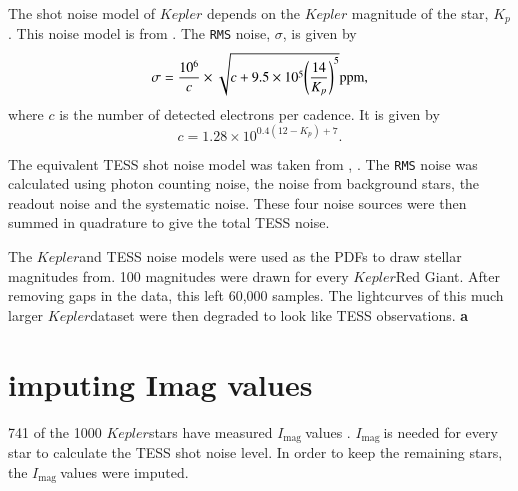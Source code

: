\documentclass[a4paper,fleqn,usenatbib,useAMS]{mnras}
\newcommand{\kep}{\ensuremath{Kepler}\:}
\newcommand{\imag}{\ensuremath{I_{\textrm{mag}}\:}}
\begin{document}
The shot noise model of $Kepler$ depends on the $Kepler$ magnitude of the star, $K_{p}$. This noise model is from \citet{gilliland_initial_2010}. The \texttt{RMS} noise, $\sigma$, is given by
\begin{equation}
\sigma = \frac{10^{6}}{c} \times \sqrt{c+9.5 \times 10^{5}\Bigg(\frac{14}{K_{p}}\Bigg)^{5}}  {\rm ppm},
\label{eq:kep noise}
\end{equation}
where $c$ is the number of detected electrons per cadence. It is given by
\begin{equation}
c = 1.28 \times 10^{0.4(12-K_{p})+7} .
\end{equation}

The equivalent TESS shot noise model was taken from \citet{sullivan_transiting_2015}, \citet{campante_asteroseismic_2016}. The \texttt{RMS} noise was calculated using photon counting noise, the noise from background stars, the readout noise and the systematic noise. These four noise sources were then summed in quadrature to give the total TESS noise.

The \kep and TESS noise models were used as the PDFs to draw stellar magnitudes from. 100 magnitudes were drawn for every \kep Red Giant. After removing gaps in the data, this left 60,000 samples. The lightcurves of this much larger \kep dataset were then degraded to look like TESS observations. {\bf a}



\section{imputing Imag values}

741 of the 1000 \kep stars have measured \imag values \citep{hog_tycho-2_2000}. \imag is needed for every star to calculate the TESS shot noise level. In order to keep the remaining stars, the \imag values were imputed.
\end{document}
